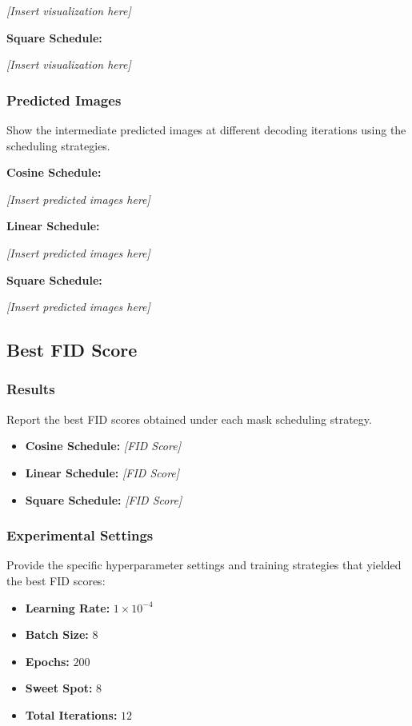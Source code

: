 \textit{[Insert visualization here]}

\textbf{Square Schedule:}

\textit{[Insert visualization here]}

\subsubsection{Predicted Images}
Show the intermediate predicted images at different decoding iterations using the scheduling strategies.

\textbf{Cosine Schedule:}

\textit{[Insert predicted images here]}

\textbf{Linear Schedule:}

\textit{[Insert predicted images here]}

\textbf{Square Schedule:}

\textit{[Insert predicted images here]}

\subsection{Best FID Score}

\subsubsection{Results}
Report the best FID scores obtained under each mask scheduling strategy.

\begin{itemize}
    \item \textbf{Cosine Schedule:} \textit{[FID Score]}
    \item \textbf{Linear Schedule:} \textit{[FID Score]}
    \item \textbf{Square Schedule:} \textit{[FID Score]}
\end{itemize}

\subsubsection{Experimental Settings}
Provide the specific hyperparameter settings and training strategies that yielded the best FID scores:

\begin{itemize}
    \item \textbf{Learning Rate:} $1\times10^{-4}$
    \item \textbf{Batch Size:} $8$
    \item \textbf{Epochs:} $200$
    \item \textbf{Sweet Spot:} $8$
    \item \textbf{Total Iterations:} $12$
\end{itemize}
